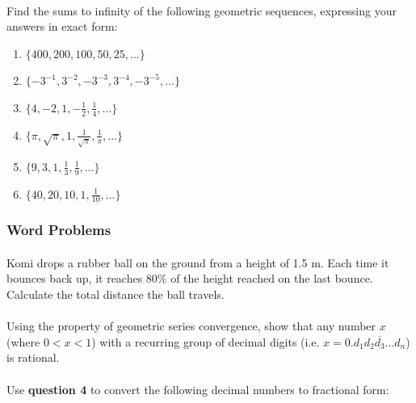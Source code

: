 \documentclass[12pt, a4paper, titlepage, twoside]{article}
\begin{document}
	\paragraph{}
	 Find the sums to infinity of the following geometric sequences, expressing your answers in exact
	form:
	
	\begin{multicols}{2}
		\begin{enumerate}[label=\textbf{(\alph*)}]
			\item $\{400, 200, 100, 50, 25,...\}$
			\item $\{-3^{-1}, 3^{-2}, -3^{-3}, 3^{-4}, -3^{-5}, ...\}$
			\item $\{4, -2, 1, -\frac{1}{2}, \frac{1}{4},...\}$
			\item $\{\pi, \sqrt{\pi}, 1, \frac{1}{\sqrt{\pi}}, \frac{1}{\pi}, ...\}$
			\item $\{9, 3, 1, \frac{1}{3}, \frac{1}{9},...\}$
			\item $\{40, 20, 10, 1, \frac{1}{10},...\}$
		\end{enumerate}
	\end{multicols}
	
	\subsubsection*{Word Problems}	
	
	\paragraph{}
	 Komi drops a rubber ball on the ground from a height of 1.5 m. Each time it bounces back up, it reaches
	$80\%$ of the height reached on the last bounce. Calculate the total distance the ball travels.
	
	\paragraph{}
	 Using the property of geometric series convergence, show that any number $x$ (where $0 < x < 1$) 
	with a recurring group of decimal digits (i.e. $x = 0.\overline{d_1 d_2 d_3 ... d_n}$) is rational.
	
	\paragraph{}
	 Use \textbf{question 4} to convert the following decimal numbers to fractional form:
	
\end{document}
